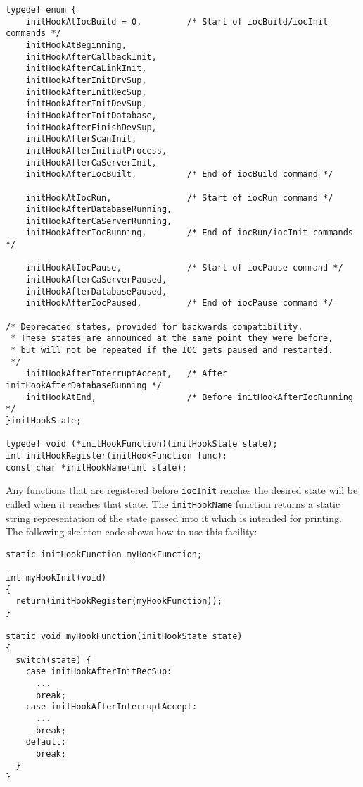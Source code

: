 \begin{verbatim}
typedef enum {
    initHookAtIocBuild = 0,         /* Start of iocBuild/iocInit commands */
    initHookAtBeginning,
    initHookAfterCallbackInit,
    initHookAfterCaLinkInit,
    initHookAfterInitDrvSup,
    initHookAfterInitRecSup,
    initHookAfterInitDevSup,
    initHookAfterInitDatabase,
    initHookAfterFinishDevSup,
    initHookAfterScanInit,
    initHookAfterInitialProcess,
    initHookAfterCaServerInit,
    initHookAfterIocBuilt,          /* End of iocBuild command */

    initHookAtIocRun,               /* Start of iocRun command */
    initHookAfterDatabaseRunning,
    initHookAfterCaServerRunning,
    initHookAfterIocRunning,        /* End of iocRun/iocInit commands */

    initHookAtIocPause,             /* Start of iocPause command */
    initHookAfterCaServerPaused,
    initHookAfterDatabasePaused,
    initHookAfterIocPaused,         /* End of iocPause command */

/* Deprecated states, provided for backwards compatibility.
 * These states are announced at the same point they were before,
 * but will not be repeated if the IOC gets paused and restarted.
 */
    initHookAfterInterruptAccept,   /* After initHookAfterDatabaseRunning */
    initHookAtEnd,                  /* Before initHookAfterIocRunning */
}initHookState;

typedef void (*initHookFunction)(initHookState state);
int initHookRegister(initHookFunction func);
const char *initHookName(int state);
\end{verbatim}

Any functions that are registered before \verb|iocInit| reaches the desired state will be called when it reaches that state.
The \verb|initHookName| function returns a static string representation of the state passed into it which is intended for printing.
The following skeleton code shows how to use this facility:

\begin{verbatim}
static initHookFunction myHookFunction;

int myHookInit(void)
{
  return(initHookRegister(myHookFunction));
}

static void myHookFunction(initHookState state)
{
  switch(state) {
    case initHookAfterInitRecSup:
      ...
      break;
    case initHookAfterInterruptAccept:
      ...
      break;
    default:
      break;
  }
}
\end{verbatim}

